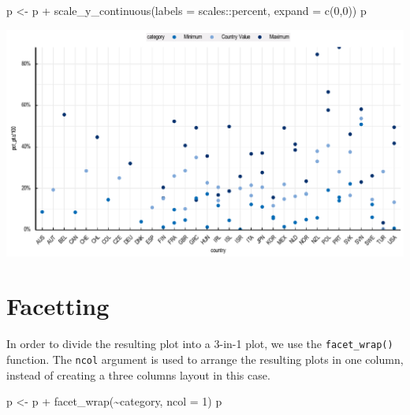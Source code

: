 \documentclass[
  11pt,
  oneside]{report}
\newenvironment{Shaded}{\begin{snugshade}}{\end{snugshade}}
\newcommand{\AttributeTok}[1]{\textcolor[rgb]{0.77,0.63,0.00}{#1}}
\newcommand{\DecValTok}[1]{\textcolor[rgb]{0.00,0.00,0.81}{#1}}
\newcommand{\FunctionTok}[1]{\textcolor[rgb]{0.00,0.00,0.00}{#1}}
\newcommand{\NormalTok}[1]{#1}
\newcommand{\OtherTok}[1]{\textcolor[rgb]{0.56,0.35,0.01}{#1}}
\newcommand{\SpecialCharTok}[1]{\textcolor[rgb]{0.00,0.00,0.00}{#1}}
\begin{document}
\begin{Shaded}
\begin{Highlighting}[]
\NormalTok{p }\OtherTok{\textless{}{-}}\NormalTok{ p }\SpecialCharTok{+}
  \FunctionTok{scale\_y\_continuous}\NormalTok{(}\AttributeTok{labels =}\NormalTok{ scales}\SpecialCharTok{::}\NormalTok{percent, }\AttributeTok{expand =} \FunctionTok{c}\NormalTok{(}\DecValTok{0}\NormalTok{,}\DecValTok{0}\NormalTok{))}
\NormalTok{p}
\end{Highlighting}
\end{Shaded}

\begin{center}\includegraphics{book_figures/scatterplot_4-1} \end{center}

\hypertarget{facetting-1}{%
\section{Facetting}\label{facetting-1}}

In order to divide the resulting plot into a 3-in-1 plot, we use the
\texttt{facet\_wrap()} function. The \texttt{ncol} argument is used to
arrange the resulting plots in one column, instead of creating a three
columns layout in this case.

\begin{Shaded}
\begin{Highlighting}[]
\NormalTok{p }\OtherTok{\textless{}{-}}\NormalTok{ p }\SpecialCharTok{+}
  \FunctionTok{facet\_wrap}\NormalTok{(}\SpecialCharTok{\textasciitilde{}}\NormalTok{category, }\AttributeTok{ncol =} \DecValTok{1}\NormalTok{)}
\NormalTok{p}
\end{Highlighting}
\end{Shaded}
\end{document}
